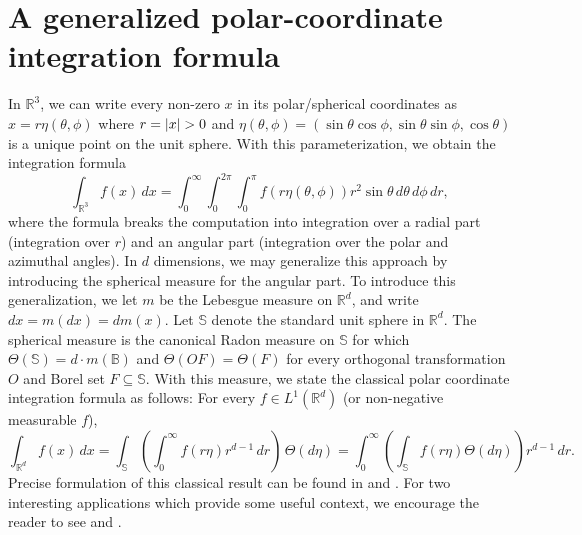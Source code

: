 \documentclass[11pt, letter]{book}
\begin{document}
\section{A generalized polar-coordinate integration formula}


In $\mathbb{R}^3$, we can write every non-zero $x$ in its polar/spherical coordinates as $x=r\eta(\theta,\phi)$ where $r=\abs{x}>0$ and $\eta(\theta,\phi)=(\sin\theta \cos\phi,\sin\theta \sin\phi,\cos\theta)$ is a unique point on the unit sphere. With this parameterization, we obtain the integration formula 
\begin{equation*}
    \int_{\mathbb{R}^3} f(x)\,dx = \int_{0}^\infty \int_{0}^{2\pi} \int_0^{\pi} f(r\eta(\theta,\phi)) r^2 \sin\theta \,d\theta\, d\phi \, dr,
\end{equation*}
where the formula breaks the computation into integration over a radial part (integration over $r$) and an angular part (integration over the polar and azimuthal angles). In $d$ dimensions, we may generalize this approach by introducing the spherical measure for the angular part.  To introduce this generalization, we let $m$ be the Lebesgue measure on $\mathbb{R}^d$, and write $dx=m(dx)=dm(x)$. Let $\mathbb{S}$ denote the standard unit sphere in $\mathbb{R}^d$. The spherical measure is the canonical Radon measure on $\mathbb{S}$ for which $\Theta(\mathbb{S})=d\cdot m(\mathbb{B})$ and $\Theta(OF)=\Theta(F)$ for every orthogonal transformation $O$ and Borel set $F\subseteq\mathbb{S}$. With this measure, we state the classical polar coordinate integration formula as follows: For every $f\in L^1(\mathbb{R}^d)$ (or non-negative measurable $f$),
\begin{equation}\label{eq:StandardPolarIntegrationFormula}
\int_{\mathbb{R}^d}f(x)\,dx=\int_{\mathbb{S}}\left(\int_0^\infty f(r\eta)r^{d-1}\,dr\right)\,\Theta(d\eta)=\int_0^\infty\left(\int_\mathbb{S}f(r\eta)\Theta(d\eta)\right)r^{d-1}\,dr.
\end{equation}
Precise formulation of this classical result can be found in \cite{stein_real_2009} and \cite{folland_real_2013}. For two interesting applications which provide some useful context, we encourage the reader to see \cite{baker_integration_1997} and \cite{folland_how_2001}.\\
\end{document}
